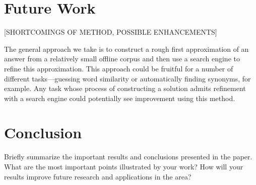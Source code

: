 \documentclass{article}
\begin{document}
\section{Future Work}


[SHORTCOMINGS OF METHOD, POSSIBLE ENHANCEMENTS]

The general approach we take is to construct a rough first approximation of an answer from a relatively small offline corpus and then use a search engine to refine this approximation.
This approach could be fruitful for a number of different tasks---guessing word similarity or automatically finding synonyms, for example.
Any task whose process of constructing a solution admits refinement with a search engine  could potentially see improvement using this method.

\section{Conclusion}

Briefly summarize the important results and conclusions presented in the paper. What are the most important points illustrated by your work? How will your results improve future research and applications in the area? 




{}

\end{document}
